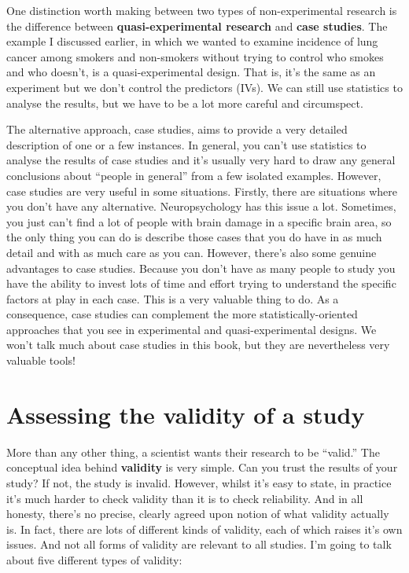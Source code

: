 \documentclass[
]{book}
\begin{document}
One distinction worth making between two types of non-experimental research is the difference between {\textbf{quasi-experimental research}} and {\textbf{case studies}}. The example I discussed earlier, in which we wanted to examine incidence of lung cancer among smokers and non-smokers without trying to control who smokes and who doesn't, is a quasi-experimental design. That is, it's the same as an experiment but we don't control the predictors (IVs). We can still use statistics to analyse the results, but we have to be a lot more careful and circumspect.

The alternative approach, case studies, aims to provide a very detailed description of one or a few instances. In general, you can't use statistics to analyse the results of case studies and it's usually very hard to draw any general conclusions about ``people in general'' from a few isolated examples. However, case studies are very useful in some situations. Firstly, there are situations where you don't have any alternative. Neuropsychology has this issue a lot. Sometimes, you just can't find a lot of people with brain damage in a specific brain area, so the only thing you can do is describe those cases that you do have in as much detail and with as much care as you can. However, there's also some genuine advantages to case studies. Because you don't have as many people to study you have the ability to invest lots of time and effort trying to understand the specific factors at play in each case. This is a very valuable thing to do. As a consequence, case studies can complement the more statistically-oriented approaches that you see in experimental and quasi-experimental designs. We won't talk much about case studies in this book, but they are nevertheless very valuable tools!

\hypertarget{validity}{%
\section{Assessing the validity of a study}\label{validity}}

More than any other thing, a scientist wants their research to be ``valid.'' The conceptual idea behind {\textbf{validity}} is very simple. Can you trust the results of your study? If not, the study is invalid. However, whilst it's easy to state, in practice it's much harder to check validity than it is to check reliability. And in all honesty, there's no precise, clearly agreed upon notion of what validity actually is. In fact, there are lots of different kinds of validity, each of which raises it's own issues. And not all forms of validity are relevant to all studies. I'm going to talk about five different types of validity:
\end{document}
